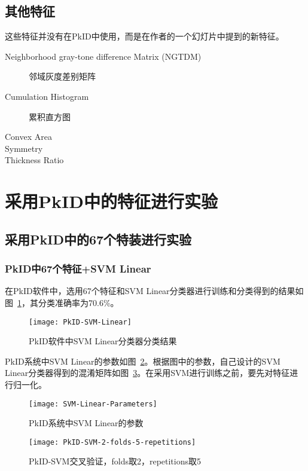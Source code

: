 \subsection{其他特征}
这些特征并没有在PkID中使用，而是在作者的一个幻灯片中提到的新特征。
\begin{description}
\item[Neighborhood gray-tone difference Matrix (NGTDM)] 邻域灰度差别矩阵
\item[Cumulation Histogram] 累积直方图
\item[Convex Area] 
\item[Symmetry] 
\item[Thickness Ratio]
\end{description}


\section{采用PkID中的特征进行实验}

\subsection{采用PkID中的67个特装进行实验}
\subsubsection{PkID中67个特征+SVM Linear}
在PkID软件中，选用67个特征和SVM Linear分类器进行训练和分类得到的结果如图~\ref{fig:PkID-SVM-Linear}，其分类准确率为70.6\%。
\begin{figure}[!ht]
\centering
\texttt{[image: PkID-SVM-Linear]}
\caption{PkID软件中SVM Linear分类器分类结果}
\label{fig:PkID-SVM-Linear}
\end{figure}

PkID系统中SVM Linear的参数如图~\ref{fig:SVM-Linear-Parameters}。根据图中的参数，自己设计的SVM Linear分类器得到的混淆矩阵如图~\ref{fig: PkID-SVM-2-folds-5-repetitions}。在采用SVM进行训练之前，要先对特征进行归一化。
\begin{figure}[!ht]
\centering
\texttt{[image: SVM-Linear-Parameters]}
\caption{PkID系统中SVM Linear的参数}
\label{fig:SVM-Linear-Parameters}
\end{figure}
\begin{figure}[!ht]
\centering
\texttt{[image: PkID-SVM-2-folds-5-repetitions]}
\caption{PkID-SVM交叉验证，folds取2，repetitions取5}
\label{fig: PkID-SVM-2-folds-5-repetitions}
\end{figure}

